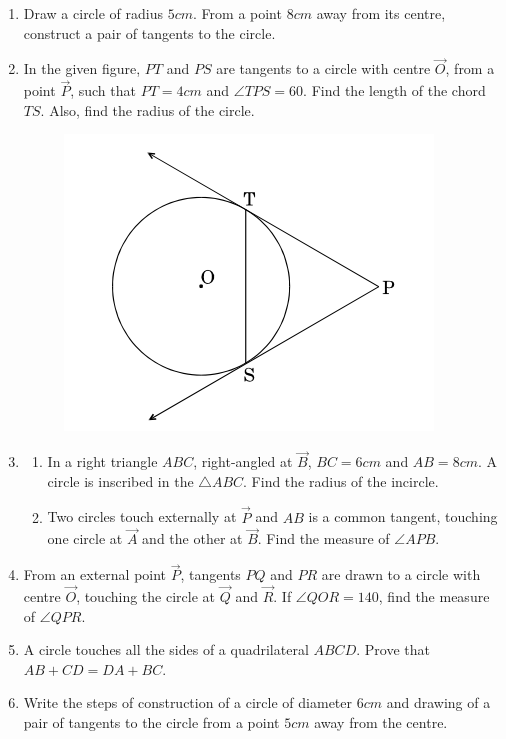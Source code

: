 \begin{enumerate}
\begin{figure}[H]
			\caption{}
			\label{fig:circ-2}
		\end{figure}
	\item Draw a circle of radius $5 cm$. From a point $8 cm$ away from its centre, construct a pair of tangents to the circle.
	\item In the given figure, $PT$ and $PS$ are tangents to a circle with centre $\vec{O}$, from a point $\vec{P}$, such that $PT = 4 cm$ and $\angle TPS = 60$\degree. Find the length of the chord $TS$. Also, find the radius of the circle.
		\begin{figure}[H]
			\centering
			\includegraphics[width=\columnwidth]{figs/circ-3.png}
			\caption{}
			\label{fig:circ-3}
		\end{figure}
	\item \begin{enumerate}[label=(\alph*)]
			\item In a right triangle $ABC$, right-angled at $\vec{B}$, $BC = 6 cm$ and $AB = 8 cm$. A circle is inscribed in the $\triangle ABC$. Find the radius of the incircle.
			\item Two circles touch externally at $\vec{P}$ and $AB$ is a common tangent, touching one circle at $\vec{A}$ and the other at $\vec{B}$. Find the measure of $\angle APB$.
		\end{enumerate}
	\item From an external point $\vec{P}$, tangents $PQ$ and $PR$ are drawn to a circle with centre $\vec{O}$, touching the circle at $\vec{Q}$ and $\vec{R}$. If $\angle QOR = 140$\degree, find the measure of $\angle QPR$.
	\item A circle touches all the sides of a quadrilateral $ABCD$. Prove that $AB + CD = DA + BC$.
	\item Write the steps of construction of a circle of diameter $6 cm$ and drawing of a pair of tangents to the circle from a point $5 cm$ away from the centre.
\end{enumerate}

                                                                                
